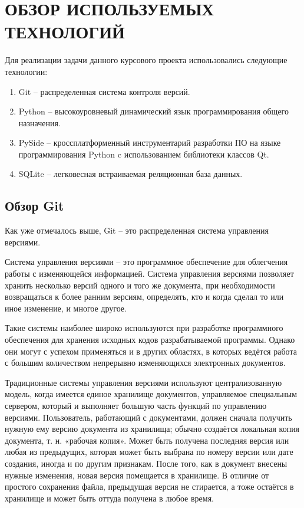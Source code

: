 \section{ОБЗОР ИСПОЛЬЗУЕМЫХ ТЕХНОЛОГИЙ}
\label{sec:tech-overview}

\vspace{0.6cm}

Для реализации задачи данного курсового проекта использовались следующие
технологии:

\begin{enumerate}
    \item Git -- распределенная система контроля версий.

    \item Python -- высокоуровневый динамический язык программирования общего назначения.

    \item PySide -- кроссплатформенный инструментарий разработки ПО на языке программирования Python c использованием
          библиотеки классов Qt.

    \item SQLite -- легковесная встраиваемая реляционная база данных.

    

\end{enumerate}

\subsection{Обзор Git}
\label{subsec:git-overview}

Как уже отмечалось выше, Git -- это распределенная система управления версиями.

Система управления версиями -- это программное обеспечение для облегчения работы с
изменяющейся информацией. Система управления версиями позволяет хранить несколько версий
одного и того же документа, при необходимости возвращаться к более ранним версиям, определять,
кто и когда сделал то или иное изменение, и многое другое.

Такие системы наиболее широко используются при разработке программного обеспечения для
хранения исходных кодов разрабатываемой программы. Однако они могут с успехом применяться и
в других областях, в которых ведётся работа с большим количеством непрерывно изменяющихся электронных
документов.

Традиционные системы управления версиями используют централизованную модель, когда имеется единое
хранилище документов, управляемое специальным сервером, который и выполняет большую часть функций
по управлению версиями. Пользователь, работающий с документами, должен сначала получить нужную
ему версию документа из хранилища; обычно создаётся локальная копия документа, т. н. «рабочая копия».
Может быть получена последняя версия или любая из предыдущих, которая может быть выбрана по номеру
версии или дате создания, иногда и по другим признакам. После того, как в документ внесены нужные
изменения, новая версия помещается в хранилище. В отличие от простого сохранения файла, предыдущая
версия не стирается, а тоже остаётся в хранилище и может быть оттуда получена в любое время.

